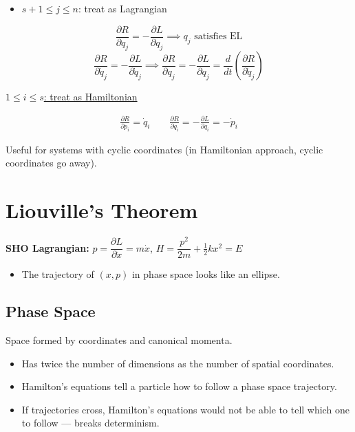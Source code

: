 \begin{itemize}
    \item $s+1 \leq j \leq n$: treat as Lagrangian
\end{itemize}
\[
    \frac{\partial R}{\partial q_j} = -\frac{\partial L}{\partial q_j} \implies q_j \text{ satisfies EL}
\]
\[
    \frac{\partial R}{\partial \dot{q}_j} = -\frac{\partial L}{\partial \dot{q}_j} \implies \frac{\partial R}{\partial q_j} = -\frac{\partial L}{\partial q_j} = \frac{d}{dt}\!\left(\frac{\partial R}{\partial \dot{q}_j}\right)
\]

\underline{$1 \leq i \leq s$: treat as Hamiltonian}

\begin{align*}
    \boxed{\frac{\partial R}{\partial p_i} = \dot{q}_i} \qquad \boxed{\frac{\partial R}{\partial q_i} = -\frac{\partial L}{\partial q_i} = -\dot{p}_i}
\end{align*}

Useful for systems with cyclic coordinates (in Hamiltonian approach, cyclic coordinates go away).


\chapter{Liouville's Theorem}

\textbf{SHO Lagrangian:} $p = \dfrac{\partial L}{\partial \dot{x}} = m\dot{x}$, $H = \dfrac{p^2}{2m} + \tfrac{1}{2}kx^2 = E$

\begin{itemize}
    \item The trajectory of $(x,p)$ in phase space looks like an ellipse.
\end{itemize}

\section{Phase Space}

\begin{definition}
Space formed by coordinates and canonical momenta.
\begin{itemize}
    \item Has twice the number of dimensions as the number of spatial coordinates.
    \item Hamilton's equations tell a particle how to follow a phase space trajectory.
    \item If trajectories cross, Hamilton's equations would not be able to tell which one to follow --- breaks determinism.
\end{itemize}
\end{definition}

